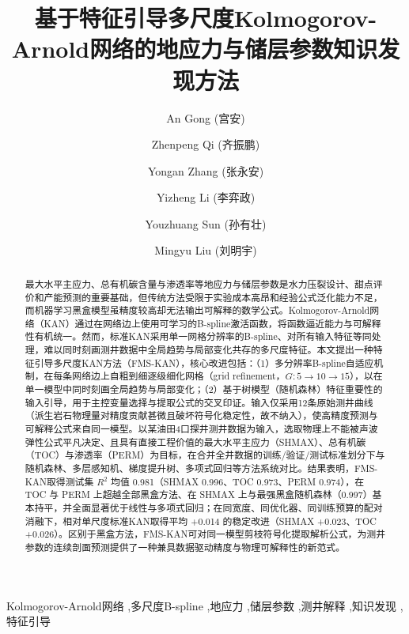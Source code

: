 \documentclass[final,3p,times,twocolumn]{elsarticle}
\begin{document}
\begin{frontmatter}

\title{基于特征引导多尺度Kolmogorov-Arnold网络的地应力与储层参数知识发现方法}

\author[cupb]{An Gong (宫安)}
\author[cupb]{Zhenpeng Qi (齐振鹏)}
\author[polyu,eit]{Yongan Zhang (张永安)}
\author[polyu,eit]{Yizheng Li (李弈政)}
\author[cupb]{Youzhuang Sun (孙有壮)}
\author[colo]{Mingyu Liu (刘明宇)}


\begin{abstract}
最大水平主应力、总有机碳含量与渗透率等地应力与储层参数是水力压裂设计、甜点评价和产能预测的重要基础，但传统方法受限于实验成本高昂和经验公式泛化能力不足，而机器学习黑盒模型虽精度较高却无法输出可解释的数学公式。Kolmogorov-Arnold网络（KAN）通过在网络边上使用可学习的B-spline激活函数，将函数逼近能力与可解释性有机统一。然而，标准KAN采用单一网格分辨率的B-spline、对所有输入特征等同处理，难以同时刻画测井数据中全局趋势与局部变化共存的多尺度特征。本文提出一种特征引导多尺度KAN方法（FMS-KAN），核心改进包括：（1）多分辨率B-spline自适应机制，在每条网络边上自粗到细逐级细化网格（grid refinement，$G{:}5\to10\to15$），以在单一模型中同时刻画全局趋势与局部变化；（2）基于树模型（随机森林）特征重要性的输入引导，用于主控变量选择与提取公式的交叉印证。输入仅采用12条原始测井曲线（派生岩石物理量对精度贡献甚微且破坏符号化稳定性，故不纳入），使高精度预测与可解释公式来自同一模型。以某油田4口探井测井数据为输入，选取物理上不能被声波弹性公式平凡决定、且具有直接工程价值的最大水平主应力（SHMAX）、总有机碳（TOC）与渗透率（PERM）为目标，在合并全井数据的训练/验证/测试标准划分下与随机森林、多层感知机、梯度提升树、多项式回归等方法系统对比。结果表明，FMS-KAN取得测试集 $R^2$ 均值 0.981（SHMAX 0.996、TOC 0.973、PERM 0.974），在 TOC 与 PERM 上超越全部黑盒方法、在 SHMAX 上与最强黑盒随机森林（0.997）基本持平，并全面显著优于线性与多项式回归；在同宽度、同优化器、同训练预算的配对消融下，相对单尺度标准KAN取得平均 +0.014 的稳定改进（SHMAX +0.023、TOC +0.026）。区别于黑盒方法，FMS-KAN可对同一模型剪枝符号化提取解析公式，为测井参数的连续剖面预测提供了一种兼具数据驱动精度与物理可解释性的新范式。
\end{abstract}

\begin{keyword}
Kolmogorov-Arnold网络 \sep 多尺度B-spline \sep 地应力 \sep 储层参数 \sep 测井解释 \sep 知识发现 \sep 特征引导
\end{keyword}

\end{frontmatter}
\end{document}
